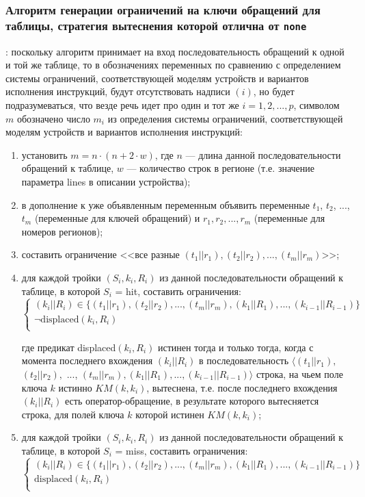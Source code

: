 \subsubsection*{Алгоритм генерации ограничений на ключи обращений для таблицы,
стратегия вытеснения которой отлична от \texttt{none}}:
поскольку алгоритм принимает на вход последовательность обращений к одной и той же таблице, то в обозначениях переменных по сравнению с определением системы ограничений, соответствующей моделям устройств и вариантов исполнения инструкций, будут отсутствовать надписи $(i)$, но будет подразумеваться, что везде речь идет про один и тот же $i = 1, 2, ..., p$, символом $m$ обозначено число $m_i$ из определения системы ограничений, соответствующей моделям устройств и вариантов исполнения инструкций: %

\begin{enumerate}
    \item установить $m = n \cdot (n + 2\cdot w)$, где $n$ --- длина данной последовательности обращений к таблице, $w$ --- количество строк в регионе (т.е. значение параметра lines в описании устройства);
    \item в дополнение к уже объявленным переменным объявить переменные $t_1$, $t_2$, ..., $t_m$ (переменные для ключей обращений) и $r_1, r_2, ..., r_m$ (переменные для номеров регионов);
    \item составить ограничение <<все разные $(t_1||r_1), (t_2||r_2), ..., (t_m||r_m)$>>;
    \item для каждой тройки $(S_i, k_i, R_i)$ из данной последовательности обращений к таблице, в которой $S_i$ = hit, составить ограничения:
$$\left\{\begin{array}{l}
    (k_i||R_i) \in \{(t_1||r_1), (t_2||r_2), ..., (t_m||r_m), (k_1||R_1), ..., (k_{i-1}||R_{i-1}) \}\\
    \neg \mbox{displaced}(k_i, R_i)\\
\end{array}\right.$$

где предикат displaced$(k_i, R_i)$ истинен тогда и только тогда, когда с момента последнего вхождения $(k_i||R_i)$ в последовательность $\langle (t_1||r_1),$ $(t_2||r_2),$ ..., $(t_m||r_m), (k_1||R_1), ..., (k_{i-1}||R_{i-1})\rangle$ строка, на чьем поле ключа $k$ истинно $KM(k, k_i)$, вытеснена, т.е. после последнего вхождения $(k_i||R_i)$ есть оператор-обращение, в результате которого вытесняется строка, для полей ключа $k$ которой истинен $KM(k, k_i)$;

    \item для каждой тройки $(S_i, k_i, R_i)$ из данной последовательности обращений к таблице, в которой $S_i$ = miss, составить ограничения:
$$\left\{\begin{array}{l}
    (k_i||R_i) \in \{(t_1||r_1), (t_2||r_2), ..., (t_m||r_m), (k_1||R_1), ...,
(k_{i-1}||R_{i-1}) \}\\
    \mbox{displaced}(k_i, R_i)\\
\end{array}\right.$$


\end{enumerate}
